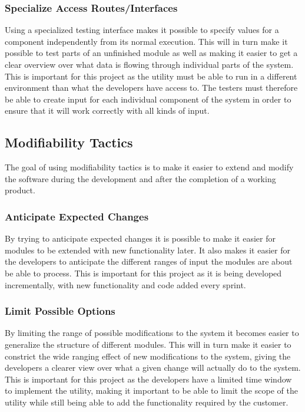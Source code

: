 \subsubsection{Specialize Access Routes/Interfaces}
Using a specialized testing interface makes it possible to specify values for a component independently from its normal execution. This will in turn make it possible to test parts of an unfinished module as well as making it easier to get a clear overview over what data is flowing through individual parts of the system. This is important for this project as the \gls{utility} must be able to run in a different environment than what the developers have access to. The testers must therefore be able to create input for each individual component of the system in order to ensure that it will work correctly with all kinds of input. 

\subsection{Modifiability Tactics}
The goal of using modifiability tactics is to make it easier to extend and modify the software during the development and after the completion of a working product.

\subsubsection{Anticipate Expected Changes}
By trying to anticipate expected changes it is possible to make it easier for modules to be extended with new functionality later. It also makes it easier for the developers to anticipate the different ranges of input the modules are about be able to process. This is important for this project as it is being developed incrementally, with new functionality and code added every sprint.

\subsubsection{Limit Possible Options}
By limiting the range of possible modifications to the system it becomes easier to generalize the structure of different modules. This will in turn make it easier to constrict the wide ranging effect of new modifications to the system, giving the developers a clearer view over what a given change will actually do to the system. This is important for this project as the developers have a limited time window to implement the \gls{utility}, making it important to be able to limit the scope of the \gls{utility} while still being able to add the functionality required by the customer.

